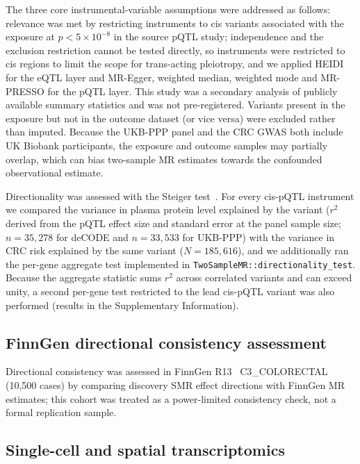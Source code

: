 \documentclass[11pt,a4paper]{article}
\begin{document}
The three core instrumental-variable assumptions were addressed as follows:
relevance was met by restricting instruments to cis variants associated with the
exposure at $p < 5\times10^{-8}$ in the source pQTL study; independence and the
exclusion restriction cannot be tested directly, so instruments were restricted
to cis regions to limit the scope for trans-acting pleiotropy, and we applied
HEIDI for the eQTL layer and MR-Egger, weighted median, weighted mode and
MR-PRESSO for the pQTL layer. This study was a secondary analysis of publicly
available summary statistics and was not pre-registered. Variants present in the exposure but not in the outcome dataset (or vice versa) were excluded rather than imputed. Because the UKB-PPP panel and the CRC GWAS both include UK Biobank participants, the exposure and outcome samples may partially overlap, which can bias two-sample MR estimates towards the confounded observational estimate.

Directionality was assessed with the Steiger test~\cite{hemani2017steiger}. For
every cis-pQTL instrument we compared the variance in plasma protein level
explained by the variant ($r^2$ derived from the pQTL effect size and standard
error at the panel sample size; $n = 35{,}278$ for deCODE and $n = 33{,}533$ for
UKB-PPP) with the variance in CRC risk explained by the same variant
($N = 185{,}616$), and we additionally ran the per-gene aggregate test
implemented in \texttt{TwoSampleMR::directionality\_test}. Because the aggregate
statistic sums $r^2$ across correlated variants and can exceed unity, a second
per-gene test restricted to the lead cis-pQTL variant was also performed
 (results in the Supplementary Information).


\subsection{FinnGen directional consistency assessment}

Directional consistency was assessed in FinnGen R13~\cite{kurki2023finngen} C3\_COLORECTAL (10,500
cases) by comparing discovery SMR effect directions with FinnGen MR estimates;
this cohort was treated as a power-limited consistency check, not a
formal replication sample.

\subsection{Single-cell and spatial transcriptomics}
\end{document}
